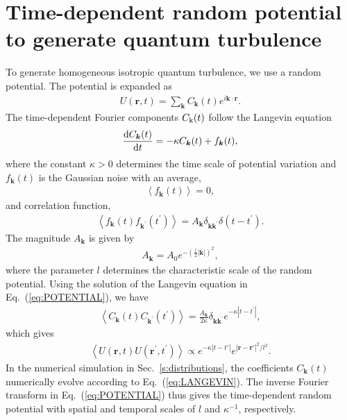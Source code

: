 \documentclass[aps,onecolumn,pra,longbibliography]{revtex4}
\begin{document}
	\section{Time-dependent random potential to generate quantum turbulence}
	\label{s:random}
	To generate homogeneous isotropic quantum turbulence,
	we use a random potential.
	The potential is expanded as
	\begin{eqnarray}
		\label{eq:POTENTIAL}
		U( {\bm r}, t) = \sum_{\bm k} C_{{\bm k}} (t) e^{i {\bm k} \cdot {\bm r}}.
	\end{eqnarray}
	The time-dependent Fourier components $C_{\rm{k}}(t)$ follow
	the Langevin equation
	\begin{eqnarray}
		\label{eq:LANGEVIN}
		\frac{{\rm d} C_{\bm k}( t)}{{\rm d}t} = -\kappa C_{\bm k}(t) + f_{\bm k}(t),
	\end{eqnarray}
	where the constant $\kappa > 0$ determines the time scale
	of potential variation
	and $f_{\bm k}(t)$ is the Gaussian noise with an average,
	\begin{eqnarray}
		\left < f_{\bm k}(t) \right> = 0,
	\end{eqnarray}
	and correlation function,
	\begin{eqnarray}
		\left < f_{\bm k}(t) f_{{\bm k}^\prime}(t^\prime)\right> =
		A_{\bm k}\delta_{{\bm k}{\bm k}^\prime}\delta(t-t^\prime).
	\end{eqnarray}
	The magnitude $A_{\bm k}$ is given by
	\begin{eqnarray}
		\label{eq:RANDOM}
		A_{\bm k} = A_0 e^{-\left(\frac{l}{2}|\bm{k}|\right)^2},
	\end{eqnarray}
	where the parameter $l$ determines the characteristic scale
	of the random potential.
	Using the solution of the Langevin equation in Eq.~(\ref{eq:POTENTIAL}), we have
	\begin{eqnarray}
		\left<
			C_{\bm k}(t)
			C_{{\bm k}^\prime}(t^\prime)
		\right>
		= \frac{A_{\bm k}}{2 \kappa} \delta_{{\bm k}{\bm k}^\prime} e^{-\kappa|t-t^\prime|},
	\end{eqnarray}
	which gives
	\begin{eqnarray}
		\left<
			U({\bm r}, t) U({\bm r}^\prime, t^\prime)
		\right> \propto
		e^{-\kappa |t-t'|} e^{|\bm{r}-\bm{r}'|^2/l^2}.
	\end{eqnarray}
	In the numerical simulation in Sec.~\ref{s:distributions},
	the coefficients $C_{\bm k}(t)$
	numerically evolve according to Eq.~(\ref{eq:LANGEVIN}). The inverse Fourier transform
	in Eq.~(\ref{eq:POTENTIAL}) thus gives the time-dependent random potential
	with spatial and temporal scales of $l$ and $\kappa^{-1}$, respectively.
\end{document}
